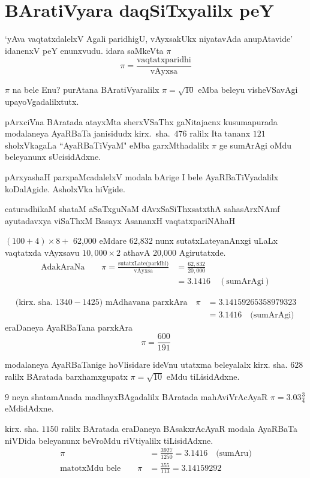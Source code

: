 \chapter{BAratiVyara daqSiTxyalilx peY}

`yAva vaqtatxdalelxV Agali paridhigU, vAyxsakUkx niyatavAda anupAtavide' idanenxV peY enunxvudu. idara saMkeVta $\pi$
$$
\pi = \frac{\text{vaqtatxparidhi}}{\text{vAyxsa}}
$$

$\pi$ na bele Enu? purAtana BAratiVyaralilx $\pi = \sqrt{10}$ eMba beleyu visheVSa\-vAgi upayoVgadalilxtutx.

pArxciVna BAratada atayxMta sherxVSaThx gaNitajacnx kusumapurada modalaneya AyaRBaTa janisidudx kirx.~sha.\ $476$ ralilx Ita tananx $121$ sholxVkagaLa ``AyaRBaTiVyaM" eMba garxMthadalilx $\pi$ ge sumArAgi oMdu beleyanunx sUcisidAdxne.

pArxyashaH parxpaMcadalelxV modala bArige I bele AyaRBaTiVyadalilx koDa\-lAgide. AsholxVka hiVgide.

\begin{center}
caturadhikaM shataM aSaTxguNaM dAvxSaSiThxsatxthA sahasArxNAmf\\
ayutadavxya viSaThxM Basayx AsananxH vaqtatxpariNAhaH
\end{center} 
 
$(100+4)\times 8 +$ {\rm 62,000} eMdare  {\rm 62,832} nunx sutatxLateyanAnxgi uLaLx vaqtatxda vAyxsavu $10,000\times 2$ athavA {\rm 20,000} Agirutatxde.
\begin{align*}
\text{AdakAraNa}\qquad \pi = \frac{\text{sutatxLate(paridhi)}}{\text{vAyxsa}} &= \frac{62,832}{20,000}\\
&= 3.1416\quad(\text{sumArAgi}) 
\end{align*} 

\begin{align*}
\text{(kirx.~sha.\ $1340-1425$) mAdhavana parxkAra} \quad\pi &= 3.14159265358979323\\
&=3.1416 \quad\text{(sumArAgi)}  
\end{align*}
eraDaneya AyaRBaTana parxkAra
$$
\pi = \frac{600}{191}
$$

modalaneya AyaRBaTanige hoVlisidare ideVnu utatxma beleyalalx kirx. sha. $628$ ralilx BAratada barxhamxgupatx $\pi = \sqrt{10}$ eMdu tiLisidAdxne.

$9$ neya shatamAnada madhayxBAgadalilx BAratada mahAviVrAcAyaR $\pi = 3.03\frac{3}{4}$ eMdidAdxne.

kirx. sha. $1150$ ralilx BAratada eraDaneya BAsakxrAcAyaR modala AyaRBaTa niVDida beleyanunx beVroMdu riVtiyalilx tiLisidAdxne.
\begin{align*}
\pi &= \frac{3927}{1250} = 3.1416 \quad\text{(sumAru)}\\
\text{matotxMdu bele}\qquad \pi &= \frac{355}{113} = 3.14159292
\end{align*}


